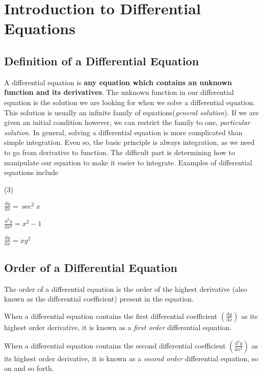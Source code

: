 \documentclass[11pt,a4paper]{book}
\begin{document}
\section{Introduction to Differential Equations}

\subsection{Definition of a Differential Equation}

A differential equation is \textbf{any equation which contains an
unknown function and its derivatives}. The unknown function in our
differential equation is the solution we are looking for when we solve
a differential equation. This solution is usually an infinite family
of equations(\textit{general solution}). If we are given an initial
condition however, we can restrict the family to one, \textit{particular
solution. }In general, solving a differential equation is more complicated
than simple integration. Even so, the basic principle is always integration,
as we need to go from derivative to function. The difficult part is
determining how to manipulate our equation to make it easier to integrate.
Examples of differential equations include

\begin{tasks}[style=itemize,label-width=3.5ex](3)

\task ${\displaystyle \frac{\mathrm{d}y}{\mathrm{d}x}=\sec^{2}x}$

\task ${\displaystyle \frac{\mathrm{d}^{2}y}{\mathrm{d}x^{2}}=x^{2}-1}$

\task ${\displaystyle \frac{\mathrm{d}y}{\mathrm{d}x}=xy^{2}}$

\end{tasks}

\subsection{Order of a Differential Equation}

The order of a differential equation is the order of the highest derivative
(also known as the differential coefficient) present in the equation.

When a differential equation contains the first differential coefficient
${\displaystyle \left(\frac{\mathrm{d}y}{\mathrm{d}x}\right)}$ as its highest order
derivative, it is known as a \textit{first order} differential equation.

When a differential equation contains the second differential coefficient
${\displaystyle \left(\frac{\mathrm{d}^{2}y}{\mathrm{d}x^{2}}\right)}$ as its highest
order derivative, it is known as a \textit{second order} differential
equation, so on and so forth.
\end{document}
